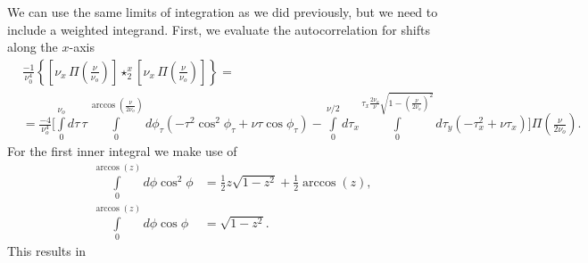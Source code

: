 \documentclass[11pt]{article}
\begin{document}
We can use the same limits of integration as we did previously, but we need to
include a weighted integrand. First, we evaluate the autocorrelation for shifts
along the $x$-axis
\begin{align}
  &\frac{-1}{\nu_0^4}\left\{\left[\nu_x\, \Pi\left(\frac{\nu}{\nu_o}\right)\right] \star_2^x \left[\nu_x\, \Pi\left(\frac{\nu}{\nu_o}\right)\right]\right\} = \\
  &=  \frac{-4}{\nu_o^4}\Bigg[\int\limits_0^{\nu_o} d\tau\, \tau \int\limits_0^{\arccos\left(\frac{\nu}{2\nu_o}\right)}d\phi_{\tau}(-\tau^2\cos^2\phi_{\tau} + \nu\tau\cos\phi_{\tau}) - \int\limits_0^{\nu/2}d\tau_x \int\limits_0^{\tau_x \frac{2\nu_o}{\nu}\sqrt{1 - \left(\frac{\nu}{2\nu_o}\right)^2}}d\tau_y(-\tau_x^2 + \nu\tau_x)\Bigg]\Pi\left(\frac{\nu}{2\nu_o}\right).
\end{align}
For the first inner integral we make use of
\begin{align}
  \int\limits_0^{\arccos(z)} d\phi \cos^2\phi &= \frac{1}{2}z\sqrt{1 - z^2} + \frac{1}{2}\arccos(z), \\
  \int\limits_0^{\arccos(z)} d\phi \cos\phi &= \sqrt{1 - z^2}.
\end{align}
This results in
\end{document}

